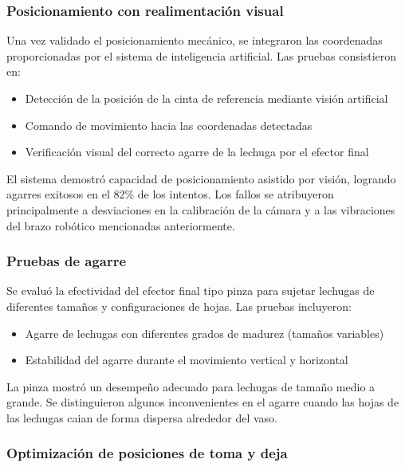\subsubsection{Posicionamiento con realimentación visual}

Una vez validado el posicionamiento mecánico, se integraron las coordenadas proporcionadas por el sistema de inteligencia artificial. Las pruebas consistieron en:

\begin{itemize}
    \item Detección de la posición de la cinta de referencia mediante visión artificial
    \item Comando de movimiento hacia las coordenadas detectadas
    \item Verificación visual del correcto agarre de la lechuga por el efector final
\end{itemize}

El sistema demostró capacidad de posicionamiento asistido por visión, logrando agarres exitosos en el 82\% de los intentos. Los fallos se atribuyeron principalmente a desviaciones en la calibración de la cámara y a las vibraciones del brazo robótico mencionadas anteriormente.

\subsubsection{Pruebas de agarre}

Se evaluó la efectividad del efector final tipo pinza para sujetar lechugas de diferentes tamaños y configuraciones de hojas. Las pruebas incluyeron:

\begin{itemize}
    \item Agarre de lechugas con diferentes grados de madurez (tamaños variables)
    \item Estabilidad del agarre durante el movimiento vertical y horizontal
\end{itemize}

La pinza mostró un desempeño adecuado para lechugas de tamaño medio a grande. Se distinguieron algunos inconvenientes en el agarre cuando las hojas de las lechugas caian de forma dispersa alrededor del vaso.

\subsubsection{Optimización de posiciones de toma y deja}

